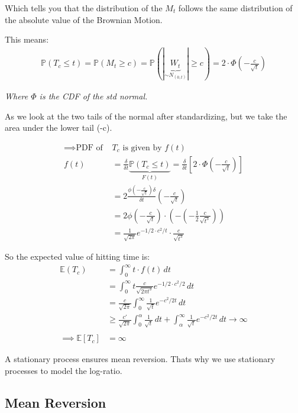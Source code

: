 \documentclass[
  oneside]{book}
\begin{document}
Which tells you that the distribution of the \(M_{t}\) follows the same distribution of the absolute value of the Brownian Motion.

This means:
\[
\begin{aligned}
\mathbb{P}(T_{c}\leq t) = \mathbb{P}(M_{t}\geq c) = \mathbb{P}(|\underbrace{ W_{t} }_{ \sim N_(0,t) }| \geq c) = 2 \cdot \Phi\left( -\frac{c}{\sqrt{ t }} \right)
\end{aligned}
\]

\emph{Where \(\Phi\) is the CDF of the std normal.}

As we look at the two tails of the normal after standardizing, but we take the area under the lower tail (-c).

\[
\begin{aligned}
\implies \text{PDF of }& T_{c} \text{ is given by } f(t)\\
f(t) &= \frac{\delta}{\delta t} \underbrace{ \mathbb{P}(T_{c}\leq t) }_{ F(t) } = \frac{\delta}{\delta t}\left[ 2\cdot \Phi\left( -\frac{c}{\sqrt{ t }} \right) \right]\\
&= 2 \frac{\phi\left( -\frac{c}{\sqrt{ t }} \right)\delta}{\delta t}\left( -\frac{c}{\sqrt{ t }} \right)\\
&= 2\phi\left( -\frac{c}{\sqrt{ t }} \right)\cdot\left( -\left( -\frac{1}{2} \frac{c}{\sqrt{ t^{3} }}\right) \right)\\
&= \frac{1}{\sqrt{ 2 \pi }}e^{-1/2 \cdot c^{2}/t}\cdot \frac{c}{\sqrt{ t^{3} }}
\end{aligned}
\]

So the expected value of hitting time is:
\[
\begin{aligned}
\mathbb{E}(T_{c}) &= \int ^{\infty}_{0} t\cdot f(t) \, dt\\ 
&= \int ^{\infty}_{0}t \frac{c}{\sqrt{ 2\pi t^{3} }}e^{-1/2 \cdot c^{2}/2} \, dt\\
&= \frac{c}{\sqrt{ 2\pi }} \int^{\infty}_{0} \frac{1}{\sqrt{ t }}e^{-c^{2}/2t} \, dt\\
&\geq \frac{c'}{\sqrt{ 2\pi }}\int^{\alpha}_{0} \frac{1}{\sqrt{ t }} \, dt + \int ^{\infty}_{\alpha} \frac{1}{\sqrt{ t }}e^{-c^{2}/2t} \, dt \to \infty\\
\\
\implies \mathbb{E}[T_{c}] &= \infty
\end{aligned}
\]

A stationary process ensures mean reversion. Thats why we use stationary processes to model the log-ratio.

\hypertarget{mean-reversion}{%
\subsection{Mean Reversion}\label{mean-reversion}}
\end{document}
